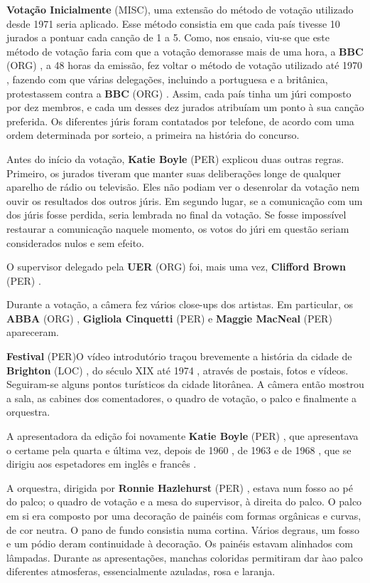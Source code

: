 \documentclass[12pt,a4paper]{article}
\begin{document}
\textbf{Votação Inicialmente} (MISC), uma extensão do método de votação utilizado desde 1971 seria aplicado. Esse método consistia em que cada país tivesse 10 jurados a pontuar cada canção de 1 a 5. Como, nos ensaio, viu-se que este método de votação faria com que a votação demorasse mais de uma hora, a \textbf{BBC} (ORG) , a 48 horas da emissão, fez voltar o método de votação utilizado até 1970 , fazendo com que várias delegações, incluindo a portuguesa e a britânica, protestassem contra a \textbf{BBC} (ORG) . Assim, cada país tinha um júri composto por dez membros, e cada um desses dez jurados atribuíam um ponto à sua canção preferida. Os diferentes júris foram contatados por telefone, de acordo com uma ordem determinada por sorteio, a primeira na história do concurso.

Antes do início da votação, \textbf{Katie Boyle} (PER) explicou duas outras regras. Primeiro, os jurados tiveram que manter suas deliberações longe de qualquer aparelho de rádio ou televisão. Eles não podiam ver o desenrolar da votação nem ouvir os resultados dos outros júris. Em segundo lugar, se a comunicação com um dos júris fosse perdida, seria lembrada no final da votação. Se fosse impossível restaurar a comunicação naquele momento, os votos do júri em questão seriam considerados nulos e sem efeito.

O supervisor delegado pela \textbf{UER} (ORG) foi, mais uma vez, \textbf{Clifford Brown} (PER) .

Durante a votação, a câmera fez vários close-ups dos artistas. Em particular, os \textbf{ABBA} (ORG) , \textbf{Gigliola Cinquetti} (PER) e \textbf{Maggie MacNeal} (PER) apareceram.



\textbf{Festival} (PER)O vídeo introdutório traçou brevemente a história da cidade de \textbf{Brighton} (LOC) , do século XIX até 1974 , através de postais, fotos e vídeos. Seguiram-se alguns pontos turísticos da cidade litorânea. A câmera então mostrou a sala, as cabines dos comentadores, o quadro de votação, o palco e finalmente a orquestra.

A apresentadora da edição foi novamente \textbf{Katie Boyle} (PER) , que apresentava o certame pela quarta e última vez, depois de 1960 , de 1963 e de 1968 , que se dirigiu aos espetadores em inglês e francês .

A orquestra, dirigida por \textbf{Ronnie Hazlehurst} (PER) , estava num fosso ao pé do palco; o quadro de votação e a mesa do supervisor, à direita do palco. O palco em si era composto por uma decoração de painéis com formas orgânicas e curvas, de cor neutra. O pano de fundo consistia numa cortina. Vários degraus, um fosso e um pódio deram continuidade à decoração. Os painéis estavam alinhados com lâmpadas. Durante as apresentações, manchas coloridas permitiram dar àao palco diferentes atmosferas, essencialmente azuladas, rosa e laranja.
\end{document}
